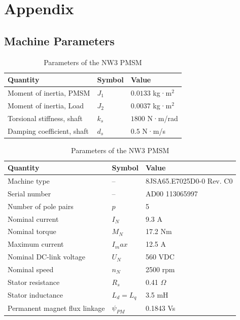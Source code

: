 \chapter{Appendix}
\label{ch:appendix_a}

\section{Machine Parameters}

\begin{table}[H]
	\centering
	\caption{Parameters of the NW3 PMSM}
	\begin{tabular}{l|l|l}
		\textbf{Quantity} & \textbf{Symbol} & \textbf{Value} \\
		\hline
        Moment of inertia, PMSM & $J_1$ & $0.0133$ kg·m$^2$ \\
        Moment of inertia, Load & $J_2$ & $0.0037$ kg·m$^2$ \\
        Torsional stiffness, shaft & $k_s$ & $1800$ N·m/rad \\
        Damping coefficient, shaft & $d_s$ & $0.5$  N·m/s \\
        \end{tabular}
    \label{tab:params_mechS}
\end{table}

\begin{table}[H]
	\centering
	\caption{Parameters of the NW3 PMSM}
	\begin{tabular}{l|l|l}
		\textbf{Quantity} & \textbf{Symbol} & \textbf{Value} \\
		\hline
		Machine type & -- & 8JSA65.E7025D0-0 Rev. C0 \\
		Serial number & -- & AD00 113065997 \\
		Number of pole pairs & $p$ & 5 \\
		Nominal current & $I_{N}$ & 9.3 A \\
		Nominal torque & $M_{N}$ & 17.2 Nm \\
		Maximum current & $I_max$ & 12.5 A \\
		Nominal DC-link voltage & $U_{N}$ & 560 VDC \\
		Nominal speed & $n_{N}$ & 2500 rpm \\
		Stator resistance & $R_{s}$ & 0.41 $\Omega$ \\
		Stator inductance & $L_{d} = L_q $ & 3.5 mH \\
		Permanent magnet flux linkage & $\psi_{PM}$ & 0.1843 Vs \\
	\end{tabular}
		\label{tab:params_NW3}
\end{table}


